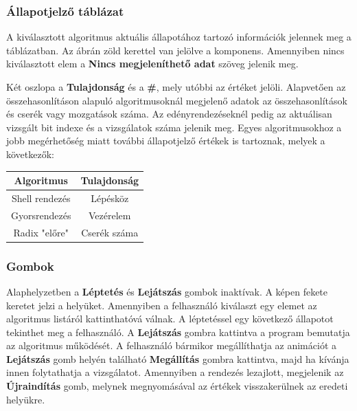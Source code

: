 \documentclass{elteikthesis}
\begin{document}
\subsubsection{Állapotjelző táblázat}
A kiválasztott algoritmus aktuális állapotához tartozó információk jelennek meg a táblázatban. Az ábrán zöld kerettel van jelölve a komponens. Amennyiben nincs kiválasztott elem a \textbf{Nincs megjeleníthető adat} szöveg jelenik meg.\par
Két oszlopa a \textbf{Tulajdonság} és a \textbf{\#}, mely utóbbi az értéket jelöli. Alapvetően az összehasonlításon alapuló algoritmusoknál megjelenő adatok az összehasonlítások és cserék vagy mozgatások száma. Az edényrendezéseknél pedig az aktuálisan vizsgált bit indexe és a vizsgálatok száma jelenik meg. Egyes algoritmusokhoz a jobb megérhetőség miatt további állapotjelző értékek is tartoznak, melyek a következők:
\begin{table}[h]
	\centering
	\begin{tabular}{|c|c|}
		\hline
		\textbf{Algoritmus} & \textbf{Tulajdonság} \\ \hline
		Shell rendezés      & Lépésköz             \\ \hline
		Gyorsrendezés       & Vezérelem            \\ \hline
		Radix "előre"       & Cserék száma         \\ \hline
	\end{tabular}
\end{table}
\subsubsection{Gombok}
Alaphelyzetben a \textbf{Léptetés} és \textbf{Lejátszás} gombok inaktívak. A képen fekete keretet jelzi a helyüket. Amennyiben a felhasználó kiválaszt egy elemet az algoritmus listáról kattinthatóvá válnak. A léptetéssel egy következő állapotot tekinthet meg a felhasználó. A \textbf{Lejátszás} gombra kattintva a program bemutatja az algoritmus működését. A felhasználó bármikor megállíthatja az animációt a \textbf{Lejátszás} gomb helyén található \textbf{Megállítás} gombra kattintva, majd ha kívánja innen folytathatja a vizsgálatot. Amennyiben a rendezés lezajlott, megjelenik az \textbf{Újraindítás} gomb, melynek megnyomásával az értékek visszakerülnek az eredeti helyükre.
\end{document}
